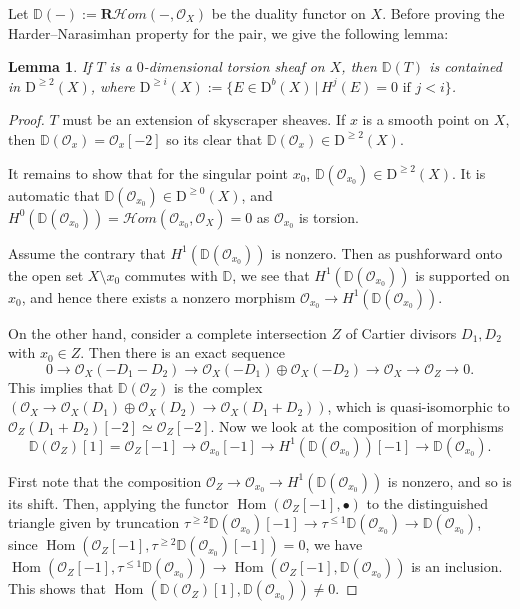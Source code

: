 \documentclass[12pt]{amsart}
\newtheorem{lemma}[theorem]{Lemma}
\theoremstyle{definition}
\DeclareMathOperator{\Hom}{Hom}
\begin{document}
Let $\mathbb{D}(-) := \mathbf{R}\mathcal{H}om(-, \mathcal{O}_X)$ be the duality functor on $X$.
Before proving the Harder--Narasimhan property for the pair, 
we give the following lemma:

\begin{lemma}\label{dual}
If $T$ is a $0$-dimensional torsion sheaf on $X$,
then $\mathbb{D}(T)$ is contained in $\mathrm{D}^{\geq 2}(X)$,
where $\mathrm{D}^{\geq i}(X):=\{ E \in \mathrm{D}^b(X) \, | \, H^j(E)=0 \text{ if } j < i \}$.
\end{lemma}
\begin{proof}
$T$ must be an extension of skyscraper sheaves.
If $x$ is a smooth point on $X$, then $\mathbb{D}(\mathcal{O}_x) = \mathcal{O}_x[-2]$ so its clear that $\mathbb{D}(\mathcal{O}_x) \in \mathrm{D}^{\geq 2}(X)$.

It remains to show that for the singular point $x_0$,
$\mathbb{D}(\mathcal{O}_{x_0}) \in \mathrm{D}^{\geq 2}(X)$.
It is automatic that $\mathbb{D}(\mathcal{O}_{x_0}) \in \mathrm{D}^{\geq 0}(X)$, 
and $H^0(\mathbb{D}(\mathcal{O}_{x_0})) = \mathcal{H}om(\mathcal{O}_{x_0},\mathcal{O}_X)=0$ as $\mathcal{O}_{x_0}$ is torsion.

Assume the contrary that $H^1(\mathbb{D}(\mathcal{O}_{x_0}))$ is nonzero. 
Then as pushforward onto the open set $X\setminus x_0$ commutes with $\mathbb{D}$,
we see that $H^1(\mathbb{D}(\mathcal{O}_{x_0}))$ is supported on $x_0$, 
and hence there exists a nonzero morphism $\mathcal{O}_{x_0} \longrightarrow H^1(\mathbb{D}(\mathcal{O}_{x_0}))$.

On the other hand, consider a complete intersection $Z$ of Cartier divisors $D_1,D_2$ with $x_0 \in Z$.
Then there is an exact sequence 
$$ 0\longrightarrow \mathcal{O}_X(-D_1-D_2) \longrightarrow \mathcal{O}_X(-D_1) \oplus \mathcal{O}_X(-D_2) \longrightarrow \mathcal{O}_X \longrightarrow \mathcal{O}_Z \longrightarrow 0.$$
This implies that $\mathbb{D}(\mathcal{O}_Z)$ is the complex $ (\mathcal{O}_X \longrightarrow \mathcal{O}_X(D_1) \oplus \mathcal{O}_X(D_2) \longrightarrow\mathcal{O}_X(D_1+D_2))$,
which is quasi-isomorphic to $\mathcal{O}_Z(D_1+D_2)[-2] \simeq \mathcal{O}_Z[-2]$.
Now we look at the composition of morphisms $$\mathbb{D}(\mathcal{O}_Z)[1]= \mathcal{O}_Z[-1] \longrightarrow \mathcal{O}_{x_0}[-1] \longrightarrow H^1(\mathbb{D}(\mathcal{O}_{x_0})) [-1] \longrightarrow \mathbb{D}(\mathcal{O}_{x_0}).$$


First note that the composition $\mathcal{O}_Z \longrightarrow \mathcal{O}_{x_0} \longrightarrow H^1(\mathbb{D}(\mathcal{O}_{x_0}))$ is nonzero, and so is its shift.
Then, applying the functor $\Hom(
\mathcal{O}_Z[-1],\bullet)$ to the distinguished triangle given by truncation $\tau^{\geq 2}\mathbb{D}(\mathcal{O}_{x_0})[-1]\longrightarrow \tau^{\leq 1}\mathbb{D}(\mathcal{O}_{x_0}) \longrightarrow\mathbb{D}(\mathcal{O}_{x_0})$,
since $\Hom(\mathcal{O}_Z[-1],\tau^{\geq 2}\mathbb{D}(\mathcal{O}_{x_0})[-1])=0$, 
we have $\Hom(\mathcal{O}_Z[-1],\tau^{\leq 1}\mathbb{D}(\mathcal{O}_{x_0})) \longrightarrow \Hom(\mathcal{O}_Z[-1],\mathbb{D}(\mathcal{O}_{x_0}))$ is an inclusion.
This shows that $\Hom(\mathbb{D}(\mathcal{O}_Z)[1],\mathbb{D}(\mathcal{O}_{x_0}))\neq 0$.


\end{proof}
\end{document}
